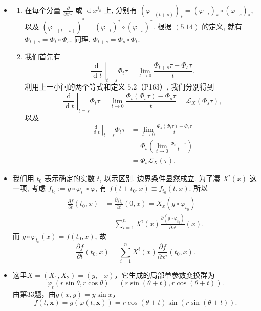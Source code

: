 \begin {itemize}
    \item[32.]
    \begin{enumerate}
        \item[(1)]
        在每个分量 $\frac{\partial}{\partial x^{i_\alpha}}$ 或 $\operatorname{d} x^{j_\beta}$ 上, 
        分别有 $(\varphi_{-(t+s)})_* = (\varphi_{-t})_* \circ (\varphi_{-s})_*$, 
        以及 $(\varphi_{-(t+s)})^* = (\varphi_{-t})^* \circ (\varphi_{-s})^*$. 
        根据 $(5.14)$ 的定义, 就有$\Phi_{t + s} = \Phi_{t} \circ \Phi_{s}$. 
        同理, $\Phi_{t + s} = \Phi_{s} \circ \Phi_{t}$.
        \item[(2)]
        我们首先有
        \[
            \left. \frac{\operatorname{d}}{\operatorname{d} t} \right|_{t = s} \Phi_t \tau = \lim_{t \rightarrow 0} \frac{\Phi_{t+s} \tau - \Phi_s \tau}{t}.
        \]
        利用上一小问的两个等式和定义 $5.2$（P163）, 我们分别得到
        \[
            \left. \frac{\operatorname{d}}{\operatorname{d} t} \right|_{t = s} \Phi_t \tau = \lim_{t \rightarrow 0} \frac{\Phi_t(\Phi_s \tau) - \Phi_s \tau}{t} = \mathscr{L}_X(\Phi_s \tau),
        \]
        以及
        \begin{align*}
            \left. \frac{\operatorname{d}}{\operatorname{d} t} \right|_{t = s} \Phi_t \tau & = \lim_{t \rightarrow 0} \frac{\Phi_s(\Phi_t \tau) - \Phi_s \tau}{t}\\
            & = \Phi_s \left( \lim_{t \rightarrow 0} \frac{\Phi_t \tau - \tau}{t} \right)\\
            & = \Phi_s \mathscr{L}_X(\tau).
        \end{align*}
    \end{enumerate}

    \item[33.]
    我们用 $t_0$ 表示确定的实数 $t$, 以示区别.
    边界条件显然成立. 为了凑 $X^i(x)$ 这一项, 
    考虑 $f_{t_0} := g \circ \varphi_{t_0} \circ \varphi$, 
    有 $f(t + t_0, x) \equiv f_{t_0}(t, x)$. 所以
    \begin{align*}
        \frac{\partial f}{\partial t}(t_0, x) & = \frac{\partial f_{t_0}}{\partial t}(0, x) = X_x(g \circ \varphi_{t_0})\\
        & = \sum_{i = 1}^n X^i(x)\frac{\partial (g \circ \varphi_{t_0})}{\partial x^i}(x).
    \end{align*}
    而 $g \circ \varphi_{t_0}(x) = f(t_0, x)$, 故
    \[
        \frac{\partial f}{\partial t}(t_0, x) = \sum_{i = 1}^n X^i(x)\frac{\partial f}{\partial x^i}(t_0, x).
    \]

    \item[34.] 
    这里$X=(X_1,X_2)=(y,-x)$，它生成的局部单参数变换群为
	\[
    \varphi_t(r\sin\theta,r\cos\theta)=(r\sin(\theta+t),r\cos(\theta+t)).
    \]
	由第33题，由$g(x,y)=y\sin x$，
    \[
        f(t,\mathbf{x})=g(\varphi(t,\mathbf{x}))=r\cos(\theta+t)\sin(r\sin(\theta+t)).
    \]
	

\end{itemize}
